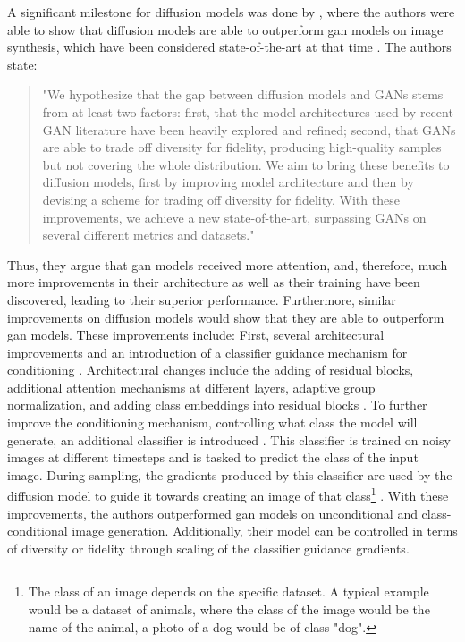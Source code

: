 A significant milestone for diffusion models was done by \cite{dhariwal2021DiffusionModelsBeat}, where the authors were able to show that diffusion models are able to outperform \gls{gan}
models on image synthesis, which have been considered state-of-the-art at that time \cite{dhariwal2021DiffusionModelsBeat}.
The authors state:

\begin{quotation}
    "We hypothesize that the gap between diffusion models and GANs stems from at least two factors: 
    first, that the model architectures used by recent GAN literature have been heavily explored and refined; 
    second, that GANs are able to trade off diversity for fidelity, producing high-quality samples but not covering the whole distribution. 
    We aim to bring these benefits to diffusion models, first by improving model architecture and then by devising a scheme for trading off diversity for fidelity. 
    With these improvements, we achieve a new state-of-the-art, surpassing GANs on several different metrics and datasets." \cite[p. 2]{dhariwal2021DiffusionModelsBeat}
\end{quotation}


Thus, they argue that \gls{gan} models received more attention, and, therefore, much more improvements in their architecture as well as their training have been discovered, leading to their superior performance.
Furthermore, similar improvements on diffusion models would show that they are able to outperform \gls{gan} models.
These improvements include:
First, several architectural improvements \cite[section 3]{dhariwal2021DiffusionModelsBeat} and an introduction of a classifier guidance mechanism for conditioning \cite[section 4]{dhariwal2021DiffusionModelsBeat}.
Architectural changes include the adding of residual blocks, additional attention mechanisms at different layers, adaptive group normalization, and adding class embeddings into residual blocks \cite{dhariwal2021DiffusionModelsBeat}.
To further improve the conditioning mechanism, \ie controlling what class the model will generate, an additional classifier is introduced \cite{dhariwal2021DiffusionModelsBeat}. 
This classifier is trained on noisy images at different timesteps and is tasked to predict the class of the input image.
During sampling, the gradients produced by this classifier are used by the diffusion model to guide it towards creating an image of that class\footnote{The class of an image depends on the specific dataset. A typical example would be a dataset of animals, where the class of the image would be the name of the animal, \eg a photo of a dog would be of class "dog".} \cite{dhariwal2021DiffusionModelsBeat}.
With these improvements, the authors outperformed \gls{gan} models on unconditional and class-conditional image generation.
Additionally, their model can be controlled in terms of diversity or fidelity through scaling of the classifier guidance gradients.

